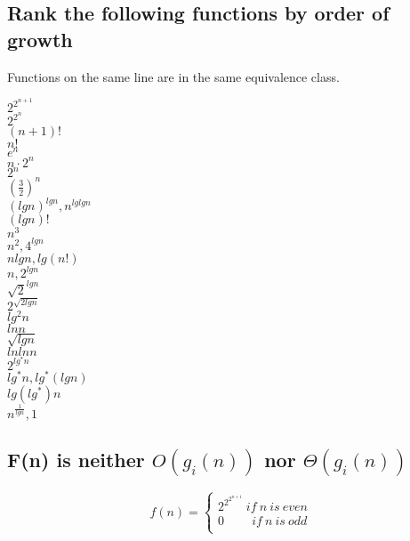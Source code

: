 \documentclass{article}
\begin{document}
\subsection{Rank the following functions by order of growth}
Functions on the same line are in the same equivalence class.\\
\begin{center}
$2^{2^{n+1}}$\\
$2^{2^n}$\\
$(n+1)!$\\
$n!$\\
$e^n$\\
$n\cdot 2^n$\\
$2^n$\\
$(\frac{3}{2})^n$\\
$(lgn)^{lgn},n^{lglgn}$\\
$(lgn)!$\\
$n^3$\\
$n^2,4^{lgn}$\\
$nlgn,lg(n!)$\\
$n,2^{lgn}$\\
$\sqrt{2}^{lgn}$\\
$2^{\sqrt{2lgn}}$\\
$lg^2n$\\
$ln{n}$\\
$\sqrt{lgn}$\\
$lnlnn$\\
$2^{lg^*n}$\\
$lg^*n,lg^*(lgn)$\\
$lg(lg^*)n$\\
$n^{\frac{1}{lgn}},1$
\end{center}
\subsection{F(n) is neither $O(g_i(n))$ nor $\Theta(g_i(n))$}
$$
f(n)=\left\{
\begin{aligned}
2^{2^{2^{n+1}}} \ if\ n\ is\ even  \\
0  \qquad \ if\ n\ is\ odd\\
\end{aligned}\right.
$$
\end{document}
